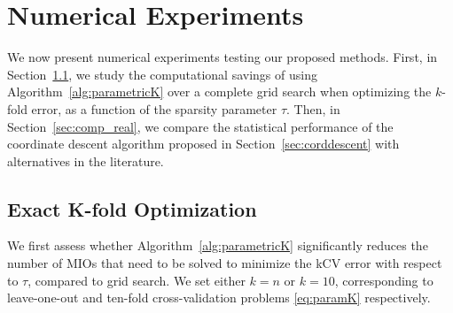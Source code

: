 \documentclass[ijoc,noblindrev]{informs3} %
\begin{document}
\section{Numerical Experiments}\label{sec:numres} 

We now present numerical experiments testing our proposed methods. First, in Section~\ref{sec:compExactLOOCV}, we study the computational savings of using Algorithm~\ref{alg:parametricK} over a complete grid search when optimizing the $k$-fold error, as a function of the sparsity parameter $\tau$. Then, in Section~\ref{sec:comp_real}, we compare the statistical performance of the coordinate descent algorithm proposed in Section~\ref{sec:corddescent} with alternatives in the literature.



\subsection{Exact K-fold Optimization}\label{sec:compExactLOOCV}

We first assess whether Algorithm~\ref{alg:parametricK} significantly reduces the number of MIOs that need to be solved to minimize the kCV error with respect to $\tau$, compared to grid search. We set either $k=n$ or $k=10$, corresponding to leave-one-out and ten-fold cross-validation problems \eqref{eq:paramK} respectively.
\end{document}

